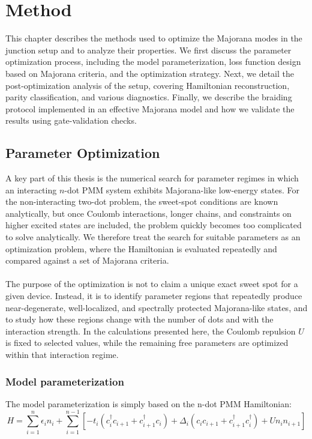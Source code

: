 \chapter{Method}
This chapter describes the methods used to optimize the Majorana modes in the junction setup and to analyze their properties. We first discuss the parameter optimization process, including the model parameterization, loss function design based on Majorana criteria, and the optimization strategy. Next, we detail the post-optimization analysis of the setup, covering Hamiltonian reconstruction, parity classification, and various diagnostics. Finally, we describe the braiding protocol implemented in an effective Majorana model and how we validate the results using gate-validation checks.
\section{Parameter Optimization}
A key part of this thesis is the numerical search for parameter regimes in which an interacting $n$-dot PMM system exhibits Majorana-like low-energy states. For the non-interacting two-dot problem, the sweet-spot conditions are known analytically, but once Coulomb interactions, longer chains, and constraints on higher excited states are included, the problem quickly becomes too complicated to solve analytically. We therefore treat the search for suitable parameters as an optimization problem, where the Hamiltonian is evaluated repeatedly and compared against a set of Majorana criteria. \\ \\
The purpose of the optimization is not to claim a unique exact sweet spot for a given device. Instead, it is to identify parameter regions that repeatedly produce near-degenerate, well-localized, and spectrally protected Majorana-like states, and to study how these regions change with the number of dots and with the interaction strength. In the calculations presented here, the Coulomb repulsion $U$ is fixed to selected values, while the remaining free parameters are optimized within that interaction regime.
\subsection{Model parameterization}
The model parameterization is simply based on the n-dot PMM Hamiltonian:
\begin{equation}
H = \sum_{i=1}^{n} \epsilon_i n_i + \sum_{i=1}^{n-1} \left[ -t_i \left(c_i^{\dagger} c_{i+1} + c_{i+1}^{\dagger} c_i\right) + \Delta_i \left(c_i c_{i+1} + c_{i+1}^{\dagger} c_i^{\dagger}\right) + U n_i n_{i+1} \right]
\end{equation}

